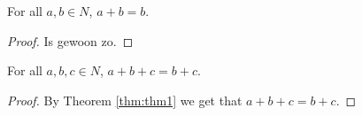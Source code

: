 %

\begin{theorem}
    \leanok
    \label{thm:thm1}
    For all $a,b \in N$, $a + b = b$.
\end{theorem}

\begin{proof} Is gewoon zo.
\end{proof}

\begin{theorem}
    \leanok
    \label{thm:thm2}
    For all $a,b,c \in N$, $a + b + c = b + c$.
\end{theorem}

\begin{proof}  \leanok By Theorem \ref{thm:thm1} we get that $a + b + c = b + c$.
\end{proof}